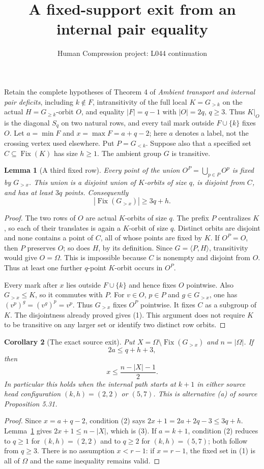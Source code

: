 \documentclass[11pt,a4paper]{article}
\title{A fixed-support exit from an internal pair equality}
\author{Human Compression project: L044 continuation}
\date{}
\newtheorem{lemma}{Lemma}
\newtheorem{corollary}[lemma]{Corollary}
\newcommand{\gen}[1]{\langle#1\rangle}
\begin{document}
\maketitle
Retain the complete hypotheses of Theorem 4 of
\emph{Ambient transport and internal pair deficits}, including
$k\notin F$, intransitivity of the full local $K=G_{>k}$ on the
actual $H=G_{\ge k}$-orbit $O$, and equality $|F|=q-1$ with
$|O|=2q$, $q\ge3$. Thus $K|_O$ is the diagonal $S_q$ on two
natural rows, and every tail mark outside $F\cup\{k\}$ fixes $O$.
Let $a=\min F$ and $x=\max F=a+q-2$; here $a$ denotes a label,
not the crossing vertex used elsewhere. Put $P=G_{<k}$.
Suppose also that a specified set $C\subseteq\operatorname{Fix}(K)$
has size $h\ge1$. The ambient group $G$ is transitive.

\begin{lemma}[A third fixed row]\label{rows}
Every point of the union $O^P=\bigcup_{p\in P}O^p$ is fixed by
$G_{>x}$. This union is a disjoint union of $K$-orbits of size $q$,
is disjoint from $C$, and has at least $3q$ points. Consequently
\[
                |\operatorname{Fix}(G_{>x})|\ge 3q+h.    \tag{1}
\]
\end{lemma}
\begin{proof}
The two rows of $O$ are actual $K$-orbits of size $q$.
The prefix $P$ centralizes $K$, so each of their translates is
again a $K$-orbit of size $q$. Distinct orbits are disjoint and
none contains a point of $C$, all of whose points are fixed by $K$.
If $O^P=O$, then $P$ preserves $O$; so does $H$, by its definition.
Since $G=\gen{P,H}$, transitivity would give $O=\Omega$.
This is impossible because $C$ is nonempty and disjoint from $O$.
Thus at least one further $q$-point $K$-orbit occurs in $O^P$.

Every mark after $x$ lies outside $F\cup\{k\}$ and hence fixes
$O$ pointwise. Also $G_{>x}\le K$, so it commutes with $P$.
For $v\in O$, $p\in P$ and $g\in G_{>x}$, one has
$(v^p)^g=(v^g)^p=v^p$. Thus $G_{>x}$ fixes $O^P$ pointwise.
It fixes $C$ as a subgroup of $K$. The disjointness already proved
gives (1). This argument does not require $K$ to be transitive
on any larger set or identify two distinct row orbits.
\end{proof}

\begin{corollary}[The exact source exit]\label{exit}
Put $X=\Omega\setminus\operatorname{Fix}(G_{>x})$ and
$n=|\Omega|$. If
\[
                         2a\le q+h+3,                  \tag{2}
\]
then
\[
                         x\le\frac{n-|X|-1}{2}.        \tag{3}
\]
In particular this holds when the internal path starts at $k+1$
in either source head configuration $(k,h)=(2,2)$ or $(5,7)$.
This is alternative (a) of source Proposition 5.31.
\end{corollary}
\begin{proof}
Since $x=a+q-2$, condition (2) says
$2x+1=2a+2q-3\le3q+h$. Lemma~\ref{rows} gives
$2x+1\le n-|X|$, which is (3). If $a=k+1$, condition (2)
reduces to $q\ge1$ for $(k,h)=(2,2)$ and to $q\ge2$ for
$(k,h)=(5,7)$; both follow from $q\ge3$.
There is no assumption $x<r-1$: if $x=r-1$, the fixed set in
(1) is all of $\Omega$ and the same inequality remains valid.
\end{proof}
\end{document}

